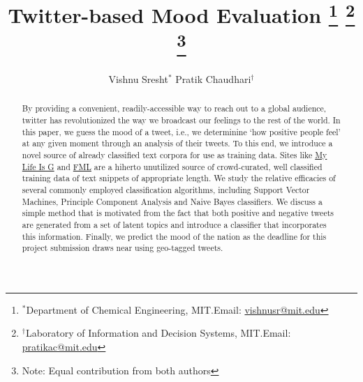 \documentclass[11pt, letterpaper, conference, final, twocolumn]{ieeeconf}
\begin{document}
\title{\bf Twitter-based Mood Evaluation
	\thanks{$^*$Department of Chemical Engineering, MIT.\newline Email: \href{mailto:vishnusr@mit.edu}{vishnusr@mit.edu}}
	\thanks{$^\dag$Laboratory of Information and Decision Systems, MIT.\newline Email: \href{mailto:pratikac@mit.edu}{pratikac@mit.edu}}
	\thanks{Note: Equal contribution from both authors}
}
\author{Vishnu Sresht$^*$ \qquad Pratik Chaudhari$^\dag$}
\maketitle

\begin{abstract}
\small{By providing a convenient, readily-accessible way to reach out to a global audience, twitter has revolutionized the way we broadcast our feelings to the rest of the world. In this paper, we guess the mood of a tweet, i.e., we determinine `how positive people feel' at any given moment through an analysis of their tweets. To this end, we introduce a novel source of already classified text corpora for use as training data. Sites like \href{http://mylifeisg.com}{My Life Is G} and \href{http://fmylife.com}{FML} are a hiherto unutilized source of crowd-curated, well classified training data of text snippets of appropriate length. We study the relative efficacies of several commonly employed classification algorithms, including Support Vector Machines, Principle Component Analysis and Naive Bayes classifiers. We discuss a simple method that is motivated from the fact that both positive and negative tweets are generated from a set of latent topics and introduce a classifier that incorporates this information. Finally, we predict the mood of the nation as the deadline for this project submission draws near using geo-tagged tweets.}
\end{abstract}
\end{document}
